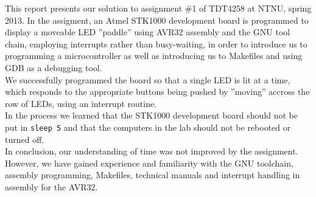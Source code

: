 This report presents our solution to assignment \#1 of TDT4258 at NTNU, spring 2013.
In the assigment, an Atmel STK1000 development board is programmed to display a moveable LED ''paddle'' using AVR32 assembly and the GNU tool chain, employing interrupts rather than busy-waiting, in order to introduce us to programming a microcontroller as well as introducing us to Makefiles and using GDB as a debugging tool.
\\
We successfully programmed the board so that a single LED is lit at a time, which responds to the appropriate buttons being pushed by ''moving'' accross the row of LEDs, using an interrupt routine.
\\
In the process we learned that the STK1000 development board should not be put in \texttt{sleep 5} and that the computers in the lab should not be rebooted or turned off.
\\
In conclusion, our understanding of time was not improved by the assignment. However, we have gained experience and familiarity with the GNU toolchain, assembly programming, Makefiles, technical manuals and interrupt handling in assembly for the AVR32.